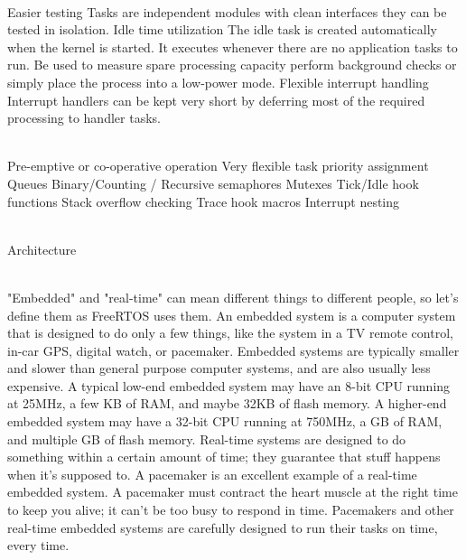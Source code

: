 \begin{description}
\os{\newpage}



\item[{\rot\bf Benefits of using real-time kernel 2}]~\\[-3ex]
\bi
\ite Easier testing
\bi
\ite Tasks are independent modules with clean interfaces they can be tested in isolation.
\ei
\ite Idle time utilization
\bi
\ite The idle task is created automatically when the kernel is started. It executes whenever there are no application tasks to run.
\ite Be used to measure spare processing capacity perform background checks or simply place the process into a low-power mode.
\ei
\ite Flexible interrupt handling
\bi
\ite Interrupt handlers can be kept very short by deferring most of the required processing to handler tasks.
\ei
\ei

\os{\newpage}



\item[{\rot\bf Standard FreeRTOS features}]~\\[-3ex]
\bi
\ite Pre-emptive or co-operative operation
\ite Very flexible task priority assignment
\ite Queues
\ite Binary/Counting / Recursive semaphores
\ite Mutexes
\ite Tick/Idle hook functions
\ite Stack overflow checking
\ite Trace hook macros
\ite Interrupt nesting
\ei

\os{\newpage}



\item[{\rot\bf FreeRTOS}]~\\[-3ex]
\bi
\ite Architecture
\ei

\os{\newpage}

\item[{\rot \bf FreeRTOS - RT and Embedded}]~\\[-3ex]
\bi
\ite "Embedded" and "real-time" can mean different things to different people, so let's define them as FreeRTOS uses them.
\ite An embedded system is a computer system that is designed to do only a few things, like the system in a TV remote control, in-car GPS, digital watch, or pacemaker. Embedded systems are typically smaller and slower than general purpose computer systems, and are also usually less expensive. A typical low-end embedded system may have an 8-bit CPU running at 25MHz, a few KB of RAM, and maybe 32KB of flash memory. A higher-end embedded system may have a 32-bit CPU running at 750MHz, a GB of RAM, and multiple GB of flash memory.
\ite Real-time systems are designed to do something within a certain amount of time; they guarantee that stuff happens when it's supposed to.
\ite A pacemaker is an excellent example of a real-time embedded system. A pacemaker must contract the heart muscle at the right time to keep you alive; it can't be too busy to respond in time. Pacemakers and other real-time embedded systems are carefully designed to run their tasks on time, every time.
\ei


\end{description}
